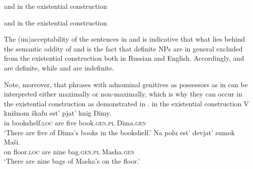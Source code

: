 \documentclass[output=paper,
colorlinks,
citecolor=brown,
newtxmath
]{langscibook}
\begin{document}

\ea \label{DE}  and  in the existential construction
\z\z

\ea\label{DE2}  and  in the existential construction
\z\z

\noindent The (un)acceptability of the sentences in  and  is indicative that what lies behind the semantic oddity of  and  is the fact that definite NPs are in general excluded from the existential construction both in Russian and English. Accordingly,  and  are definite, while  and  are indefinite.

Note, moreover, that phrases with adnominal genitives as possessors as in  can be interpreted either maximally or non-maximally, which is why they can occur in the existential construction as demonstrated in .
    \ea\label{DE-GEN} in the existential construction
	\ea\label{DEgen}
	\gll	V {knižnom škafu} est' pjat' knig Dimy.\\
	    	in bookshelf.\textsc{loc} are five book.\textsc{gen.pl} Dima.\textsc{gen}\\
	\glt	`There are five of Dima's books in the bookshelf.'
	\ex\label{DEgen2}
	\gll	Na polu est' devjat' sumok Maši.\\
			on floor.\textsc{loc} are nine bag.\textsc{gen.pl} Masha.\textsc{gen}\\
	\glt	`There are nine bags of Masha's on the floor.'
	\z\z
\end{document}
